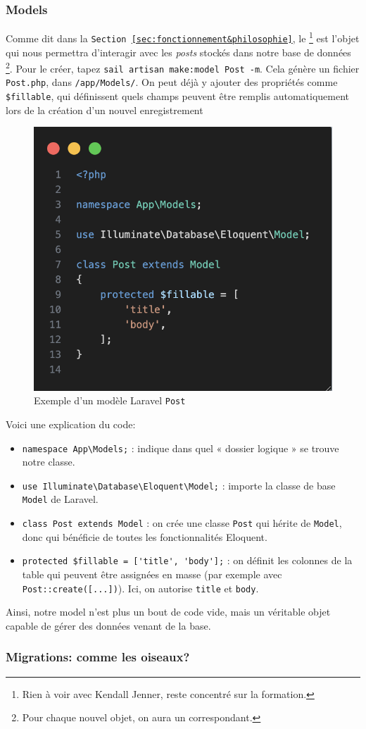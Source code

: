 \subsubsection[Models][laravel.com/docs/12.x/eloquent\#generating-model-classes]{Models}
Comme dit dans la \texttt{Section~\ref{sec:fonctionnement&philosophie}}, le \model{} \footnote{Rien à voir avec Kendall Jenner, reste concentré sur la formation.} est l'objet qui nous permettra d'interagir avec les \textit{posts} stockés dans notre base de données \footnote{Pour chaque nouvel objet, on aura un \model{} correspondant.}. Pour le créer, tapez \verb|sail artisan make:model Post -m|.
Cela génère un fichier \verb|Post.php|, dans \verb|/app/Models/|.
On peut déjà y ajouter des propriétés comme \verb|$fillable|, qui définissent quels champs peuvent être remplis automatiquement lors de la création d'un nouvel enregistrement
\begin{figure}[H]
  \centering
  \includegraphics[width=0.2\linewidth]{figures-C1/postmodel.png}
  \caption{Exemple d’un modèle Laravel \texttt{Post}}
\end{figure}
Voici une explication du code:
\begin{itemize}
  \item \verb|namespace App\Models;| : indique dans quel « dossier logique » se trouve notre classe.  
  \item \verb|use Illuminate\Database\Eloquent\Model;| : importe la classe de base \texttt{Model} de Laravel.  
  \item \verb|class Post extends Model| : on crée une classe \texttt{Post} qui hérite de \texttt{Model}, donc qui bénéficie de toutes les fonctionnalités Eloquent.  
  \item \verb|protected $fillable = ['title', 'body'];| : on définit les colonnes de la table qui peuvent être assignées en masse (par exemple avec \verb|Post::create([...])|). Ici, on autorise \texttt{title} et \texttt{body}.  
\end{itemize}
Ainsi, notre model n'est plus un bout de code vide, mais un véritable objet capable de gérer des données venant de la base.

\subsubsection[Migrations: théorie][laravel.com/docs/12.x/migrations\#introduction]{Migrations: comme les oiseaux?}

